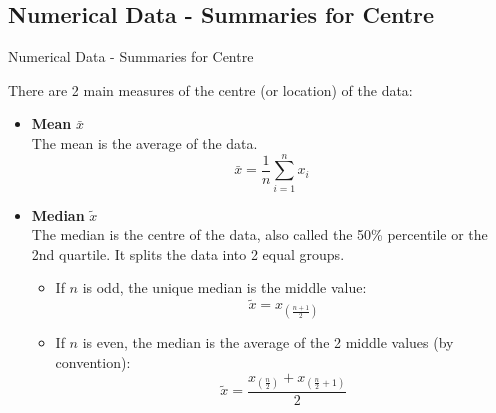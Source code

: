 \documentclass[t,xcolor=pdftex,dvipsnames,table]{beamer}\usepackage[]{graphicx}\usepackage[]{color}
\begin{document}
\subsection[]{Numerical Data - Summaries for Centre}
\begin{frame}[fragile]{Numerical Data - Summaries for Centre}

There are 2 main measures of the centre (or location) of the data:

\begin{itemize}
\item {\bf Mean} $\bar{x}$ \\
The mean is the average of the data. \\
\[ \bar{x} = \frac{1}{n} \sum_{i=1}^{n} x_{i} \]

\item {\bf Median} $\tilde{x}$ \\
The median is the centre of the data, also called the 50\% percentile or the 2nd quartile. It splits the data into 2 equal groups.  

\begin{itemize}
\item 
If $n$ is odd, the unique median is the middle value:
\[  \tilde{x} = x_{(\frac{n+1}{2})}  \]

\item
If $n$ is even, the median is the average of the 2 middle values (by convention):
\[ \tilde{x} = \frac{x_{(\frac{n}{2})} + x_{(\frac{n}{2} + 1)}}{2} \]
\end{itemize}
\end{itemize}
\end{frame}
\end{document}
